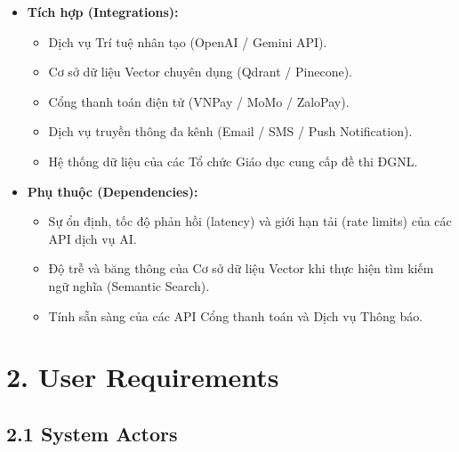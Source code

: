 \documentclass[12pt,a4paper,oneside]{report}
\begin{document}
\begin{itemize}
    \item \textbf{Tích hợp (Integrations):}
    \begin{itemize}
        \item Dịch vụ Trí tuệ nhân tạo (OpenAI / Gemini API).
        \item Cơ sở dữ liệu Vector chuyên dụng (Qdrant / Pinecone).
        \item Cổng thanh toán điện tử (VNPay / MoMo / ZaloPay).
        \item Dịch vụ truyền thông đa kênh (Email / SMS / Push Notification).
        \item Hệ thống dữ liệu của các Tổ chức Giáo dục cung cấp đề thi ĐGNL.
    \end{itemize}

    \item \textbf{Phụ thuộc (Dependencies):}
    \begin{itemize}
        \item Sự ổn định, tốc độ phản hồi (latency) và giới hạn tải (rate limits) của các API dịch vụ AI.
        \item Độ trễ và băng thông của Cơ sở dữ liệu Vector khi thực hiện tìm kiếm ngữ nghĩa (Semantic Search).
        \item Tính sẵn sàng của các API Cổng thanh toán và Dịch vụ Thông báo.
    \end{itemize}
\end{itemize}

\section*{2. User Requirements}

\subsection*{2.1 System Actors}
\end{document}
